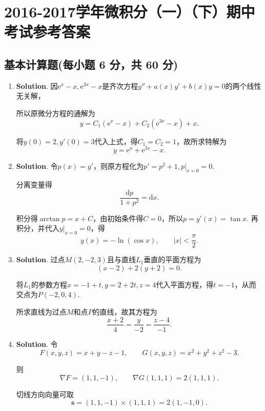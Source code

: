 \documentclass[../Main.tex]{subfiles}
\begin{document}
\chapter{2016-2017学年微积分（一）（下）期中考试参考答案}
\section{基本计算题(每小题 6 分，共 60 分)}
\begin{enumerate}
    \item \textbf{Solution}. 因$\mathrm{e}^{x}-x,\mathrm{e}^{3x}-x$是齐次方程$y''
              +a(x)y'+b(x)y=0$的两个线性无关解，

          所以原微分方程的通解为
          \[
              y=C_{1}(\mathrm{e}^{x}-x)+C_{2}(\mathrm{e}^{3x}-x)+x.
          \]

          将$y(0)=2,y'(0)=3$代入上式，得$C_{1}=C_{2}=1$，故所求特解为
          \[
              y=\mathrm{e}^{x}+\mathrm{e}^{3x}-x.
          \]

    \item \textbf{Solution}. 令$p(x)=y'$，则原方程化为$p'=p^{2}+1,p|_{x=0}=0$.

          分离变量得
          \[
              \frac{\mathrm{d}p}{1+p^{2}}=\mathrm{d}x.
          \]

          积分得$\arctan p=x+C$，由初始条件得$C=0$，所以$p=y'(x)=\tan x$.
          再积分，并代入$y|_{x=0}=0$，得
          \[
              y(x)=-\ln(\cos x),\qquad |x|<\frac{\pi}{2}.
          \]

    \item \textbf{Solution}. 过点$M(2,-2,3)$且与直线$L_{1}$垂直的平面方程为
          \[
              (x-2)+2(y+2)=0.
          \]

          将$L_{1}$的参数方程$x=-1+t,y=2+2t,z=4$代入平面方程，得$t=-1$，从而交点为$P(-2,0,4)$.

          所求直线为过点$M$和点$P$的直线，故其方程为
          \[
              \frac{x+2}{4}=\frac{y}{-2}=\frac{z-4}{-1}.
          \]

    \item \textbf{Solution}. 令
          \[
              F(x,y,z)=x+y-z-1,\qquad G(x,y,z)=x^{2}+y^{2}+z^{2}-3.
          \]

          则
          \[
              \nabla F=(1,1,-1),\qquad \nabla G(1,1,1)=2(1,1,1).
          \]

          切线方向向量可取
          \[
              \boldsymbol{s}=(1,1,-1)\times(1,1,1)=2(1,-1,0).
          \]


\end{enumerate}
\end{document}
